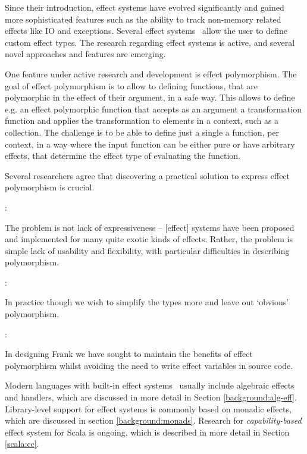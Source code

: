 

Since their introduction, effect systems have evolved significantly and gained more sophisticated features such as the ability to track non-memory related effects like IO and exceptions. Several effect systems~\cite{koka-lang, frank-lang, unison-lang, ocaml-lang} allow the user to define custom effect types. The research regarding effect systems is active, and several novel approaches and features are emerging.

One feature under active research and development is effect polymorphism. The goal of effect polymorphism is to allow to defining functions, that are polymorphic in the effect of their argument, in a safe way. This allows to define e.g. an effect polymorphic  function that accepts as an argument a transformation function and applies the transformation to elements in a context, such as a collection. The challenge is to be able to define just a single a  function, per context, in a way where the input function can be either pure or have arbitrary effects, that determine the effect type of evaluating the  function.

Several researchers agree that discovering a practical solution to express effect polymorphism is crucial. 

\textcite{scoped-capabilities}:
\begin{displayquote}
The problem is not lack of expressiveness – [effect] systems have been
proposed and implemented for many quite exotic kinds of effects. Rather, the problem is simple lack of usability and flexibility, with particular difficulties in describing polymorphism.
\end{displayquote}
\textcite{type-dir-alg-effs}:
\begin{displayquote}
In practice though we wish to simplify the types more and leave out ‘obvious’ polymorphism.
\end{displayquote}
\textcite{do-be-do-be-do}:
\begin{displayquote}
In designing Frank we have sought to maintain the benefits of effect polymorphism whilst avoiding the need to write effect variables in source code.
\end{displayquote}

Modern languages with built-in effect systems~\cite{koka-lang, frank-lang, unison-lang, ocaml-lang} usually include algebraic effects and handlers, which are discussed in more detail in Section \ref{background:alg-eff}. Library-level support for effect systems is commonly based on monadic effects, which are discussed in section \ref{background:monads}. Research for \textit{capability-based} effect system for Scala is ongoing, which is described in more detail in Section \ref{scala:cc}.

